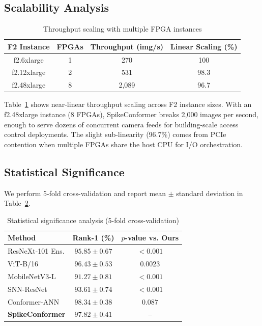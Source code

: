 \documentclass[11pt,a4paper]{article}
\begin{document}
\subsection{Scalability Analysis}

\begin{table}[H]
\centering
\caption{Throughput scaling with multiple FPGA instances}
\label{tab:scaling}
\begin{tabular}{@{}cccc@{}}
\toprule
\textbf{F2 Instance} & \textbf{FPGAs} & \textbf{Throughput (img/s)} & \textbf{Linear Scaling (\%)} \\
\midrule
f2.6xlarge & 1 & 270 & 100 \\
f2.12xlarge & 2 & 531 & 98.3 \\
f2.48xlarge & 8 & 2,089 & 96.7 \\
\bottomrule
\end{tabular}
\end{table}

Table~\ref{tab:scaling} shows near-linear throughput scaling across F2 instance sizes. With an f2.48xlarge instance (8 FPGAs), SpikeConformer breaks 2,000 images per second, enough to serve dozens of concurrent camera feeds for building-scale access control deployments. The slight sub-linearity (96.7\%) comes from PCIe contention when multiple FPGAs share the host CPU for I/O orchestration.

\subsection{Statistical Significance}

We perform 5-fold cross-validation and report mean $\pm$ standard deviation in Table~\ref{tab:statistical}.

\begin{table}[H]
\centering
\caption{Statistical significance analysis (5-fold cross-validation)}
\label{tab:statistical}
\begin{tabular}{@{}lcc@{}}
\toprule
\textbf{Method} & \textbf{Rank-1 (\%)} & \textbf{$p$-value vs. Ours} \\
\midrule
ResNeXt-101 Ens. & $95.85 \pm 0.67$ & $< 0.001$ \\
ViT-B/16 & $96.43 \pm 0.53$ & $0.0023$ \\
MobileNetV3-L & $91.27 \pm 0.81$ & $< 0.001$ \\
SNN-ResNet & $93.61 \pm 0.74$ & $< 0.001$ \\
Conformer-ANN & $98.34 \pm 0.38$ & $0.087$ \\
\textbf{SpikeConformer} & $\mathbf{97.82 \pm 0.41}$ & -- \\
\bottomrule
\end{tabular}
\end{table}
\end{document}
